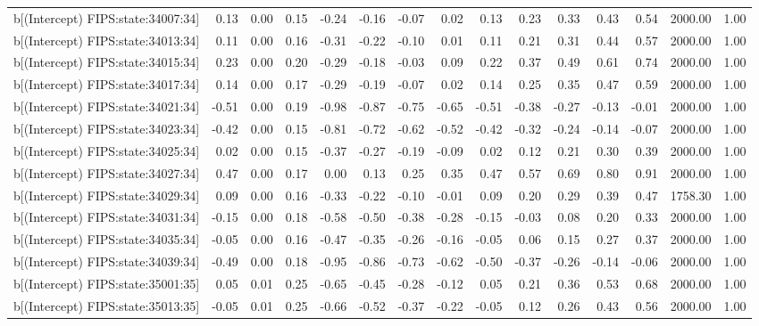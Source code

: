 \begin{table}[ht]
\begin{tabular}{rrrrrrrrrrrrrrr}
  b[(Intercept) FIPS:state:34007:34] & 0.13 & 0.00 & 0.15 & -0.24 & -0.16 & -0.07 & 0.02 & 0.13 & 0.23 & 0.33 & 0.43 & 0.54 & 2000.00 & 1.00 \\ 
  b[(Intercept) FIPS:state:34013:34] & 0.11 & 0.00 & 0.16 & -0.31 & -0.22 & -0.10 & 0.01 & 0.11 & 0.21 & 0.31 & 0.44 & 0.57 & 2000.00 & 1.00 \\ 
  b[(Intercept) FIPS:state:34015:34] & 0.23 & 0.00 & 0.20 & -0.29 & -0.18 & -0.03 & 0.09 & 0.22 & 0.37 & 0.49 & 0.61 & 0.74 & 2000.00 & 1.00 \\ 
  b[(Intercept) FIPS:state:34017:34] & 0.14 & 0.00 & 0.17 & -0.29 & -0.19 & -0.07 & 0.02 & 0.14 & 0.25 & 0.35 & 0.47 & 0.59 & 2000.00 & 1.00 \\ 
  b[(Intercept) FIPS:state:34021:34] & -0.51 & 0.00 & 0.19 & -0.98 & -0.87 & -0.75 & -0.65 & -0.51 & -0.38 & -0.27 & -0.13 & -0.01 & 2000.00 & 1.00 \\ 
  b[(Intercept) FIPS:state:34023:34] & -0.42 & 0.00 & 0.15 & -0.81 & -0.72 & -0.62 & -0.52 & -0.42 & -0.32 & -0.24 & -0.14 & -0.07 & 2000.00 & 1.00 \\ 
  b[(Intercept) FIPS:state:34025:34] & 0.02 & 0.00 & 0.15 & -0.37 & -0.27 & -0.19 & -0.09 & 0.02 & 0.12 & 0.21 & 0.30 & 0.39 & 2000.00 & 1.00 \\ 
  b[(Intercept) FIPS:state:34027:34] & 0.47 & 0.00 & 0.17 & 0.00 & 0.13 & 0.25 & 0.35 & 0.47 & 0.57 & 0.69 & 0.80 & 0.91 & 2000.00 & 1.00 \\ 
  b[(Intercept) FIPS:state:34029:34] & 0.09 & 0.00 & 0.16 & -0.33 & -0.22 & -0.10 & -0.01 & 0.09 & 0.20 & 0.29 & 0.39 & 0.47 & 1758.30 & 1.00 \\ 
  b[(Intercept) FIPS:state:34031:34] & -0.15 & 0.00 & 0.18 & -0.58 & -0.50 & -0.38 & -0.28 & -0.15 & -0.03 & 0.08 & 0.20 & 0.33 & 2000.00 & 1.00 \\ 
  b[(Intercept) FIPS:state:34035:34] & -0.05 & 0.00 & 0.16 & -0.47 & -0.35 & -0.26 & -0.16 & -0.05 & 0.06 & 0.15 & 0.27 & 0.37 & 2000.00 & 1.00 \\ 
  b[(Intercept) FIPS:state:34039:34] & -0.49 & 0.00 & 0.18 & -0.95 & -0.86 & -0.73 & -0.62 & -0.50 & -0.37 & -0.26 & -0.14 & -0.06 & 2000.00 & 1.00 \\ 
  b[(Intercept) FIPS:state:35001:35] & 0.05 & 0.01 & 0.25 & -0.65 & -0.45 & -0.28 & -0.12 & 0.05 & 0.21 & 0.36 & 0.53 & 0.68 & 2000.00 & 1.00 \\ 
  b[(Intercept) FIPS:state:35013:35] & -0.05 & 0.01 & 0.25 & -0.66 & -0.52 & -0.37 & -0.22 & -0.05 & 0.12 & 0.26 & 0.43 & 0.56 & 2000.00 & 1.00 \\ 

\end{tabular}
\end{table}

